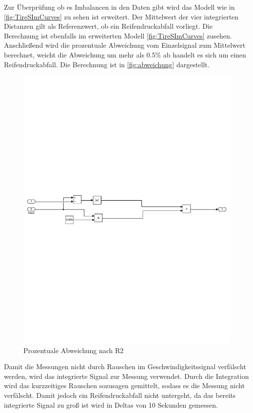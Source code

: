 Zur Überprüfung ob es Imbalancen in den Daten gibt wird das Modell wie in \autoref{fig:TireSImCurves} zu sehen ist erweitert.
Der Mittelwert der vier integrierten Distanzen gilt als Referenzwert, ob ein Reifendruckabfall vorliegt. Die Berechnung ist ebenfalls im erweiterten Modell \autoref{fig:TireSImCurves} zusehen. Anschließend wird die prozentuale Abweichung vom Einzelsignal zum Mittelwert berechnet, weicht die Abweichung um mehr als 0.5\% ab handelt es sich um einen Reifendruckabfall. Die Berechnung ist in \autoref{fig:abweichung} dargestellt. 
\vspace{-1em}
\begin{figure}[H]
	\centering
	\includegraphics[width=1\linewidth]{../Graphiken/PDFSplit/3_PDFsam_SebastianTireSim2.pdf}
	\caption{Prozentuale Abweichung nach R2}
	\label{fig:abweichung}
\end{figure}
\vspace{-1em}
Damit die Messungen nicht durch Rauschen im Geschwindigkeitssignal verfälscht werden, wird das integrierte Signal zur Messung verwendet. Durch die Integration wird das kurzzeitiges Rauschen sozusagen gemittelt, sodass es die Messung nicht verfälscht. Damit jedoch ein Reifendruckabfall nicht untergeht, da das bereits integrierte Signal zu groß ist wird in Deltas von 10 Sekunden gemessen.\\
